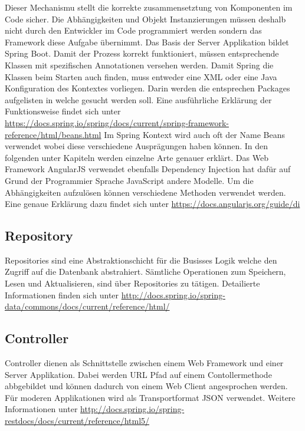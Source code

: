 Dieser Mechanismu stellt die korrekte zusammensetztung von Komponenten im Code sicher. Die Abhängigkeiten und Objekt Instanzierungen  müssen deshalb nicht durch den Entwickler im Code programmiert werden sondern das Framework diese Aufgabe übernimmt. Das Basis der Server Applikation bildet Spring Boot. Damit der Prozess korrekt funktioniert,
müssen entsprechende Klassen mit spezifischen Annotationen versehen werden. 
Damit Spring die Klassen beim Starten auch finden, muss entweder eine XML oder eine Java Konfiguration des Kontextes vorliegen. Darin werden die entsprechen Packages aufgelisten in welche gesucht werden soll. Eine ausführliche Erklärung der Funktionsweise findet sich unter \url{https://docs.spring.io/spring/docs/current/spring-framework-reference/html/beans.html}\newline
Im Spring Kontext wird auch oft der Name Beans verwendet wobei diese verschiedene Ausprägungen haben können. In den folgenden unter Kapiteln werden einzelne Arte genauer erklärt.\newline
Das Web Framework AngularJS verwendet ebenfalls Dependency Injection hat dafür auf Grund der Programmier Sprache JavaScript andere Modelle. Um die Abhängigkeiten aufzulösen können verschiedene Methoden verwendet werden. Eine genaue Erklärung dazu findet sich unter \url{https://docs.angularjs.org/guide/di}

\subsection{Repository}

Repositories sind eine Abstraktionschicht für die Busisses Logik welche den Zugriff auf die Datenbank abstrahiert. Sämtliche Operationen zum Speichern, Lesen und Aktualisieren, sind über Repositories zu tätigen.  Detailierte Informationen finden sich unter \url{http://docs.spring.io/spring-data/commons/docs/current/reference/html/}

\subsection{Controller}

Controller dienen als Schnittstelle zwischen einem Web Framework und einer Server Applikation. Dabei werden URL Pfad auf einem Contollermethode abbgebildet und können dadurch von einem Web Client angesprochen werden. Für moderen Applikationen wird als Transportformat JSON verwendet. Weitere Informationen unter \url{http://docs.spring.io/spring-restdocs/docs/current/reference/html5/}

